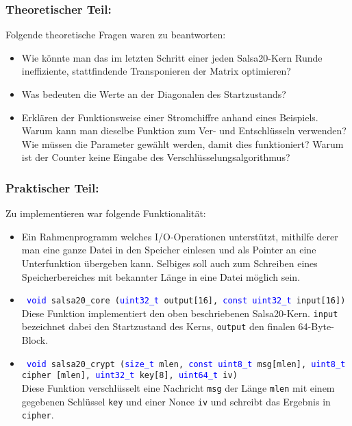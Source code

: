 \documentclass[course=erap]{aspdoc}
\begin{document}
\subsubsection{Theoretischer Teil:}
Folgende theoretische Fragen waren zu beantworten:
\begin{itemize}
    \item Wie könnte man das im letzten Schritt einer jeden Salsa20-Kern Runde ineffiziente, stattfindende Transponieren der Matrix optimieren?
    \item Was bedeuten die Werte an der Diagonalen des Startzustands?
    \item Erklären der Funktionsweise einer Stromchiffre anhand eines Beispiels. Warum kann man dieselbe Funktion zum Ver- und Entschlüsseln verwenden? Wie müssen die Parameter gewählt werden, damit dies funktioniert? Warum ist der Counter keine Eingabe des Verschlüsselungsalgorithmus?
\end{itemize}

\subsubsection{Praktischer Teil:}
Zu implementieren  war folgende Funktionalität:
\begin{itemize}
    \item Ein Rahmenprogramm welches I/O-Operationen unterstützt, mithilfe derer man eine ganze Datei in den Speicher einlesen und als Pointer an eine Unterfunktion übergeben kann. Selbiges soll auch zum Schreiben eines Speicherbereiches mit bekannter Länge in eine Datei möglich sein.
    \item \texttt{ \textcolor{blue}{void} salsa20\_core (\textcolor{blue} {uint32\_t} output[16], \textcolor{blue}{const uint32\_t} input[16])} \\
    Diese Funktion implementiert den oben beschriebenen Salsa20-Kern. \texttt{input} be\-zeich\-net dabei den Startzustand des Kerns, \texttt{output} den finalen 64-Byte-Block. \\
    \item \texttt{ \textcolor{blue} {void} salsa20\_crypt (\textcolor{blue}{size\_t} mlen, \textcolor{blue} {const uint8\_t} msg[mlen], \textcolor{blue}{uint8\_t} \break cipher [mlen], \textcolor{blue}{uint32\_t} key[8], \textcolor{blue} {uint64\_t} iv) }\\
    Diese Funktion verschlüsselt eine Nachricht \texttt{msg} der Länge \texttt{mlen} mit einem ge\-ge\-be\-nen Schlüssel \texttt{key} und einer Nonce \texttt{iv} und schreibt das Ergebnis in \texttt{cipher}.
\end{itemize}
\end{document}
